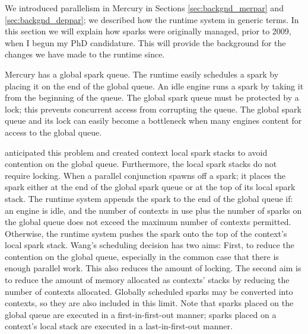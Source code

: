 We introduced parallelism in Mercury in Sections \ref{sec:backgnd_merpar} and
\ref{sec:backgnd_deppar};
we described how the runtime system in generic terms.
In this section we will explain how sparks were originally managed,
prior to 2009, when I begun my PhD candidature.
This will provide the background for the changes we have made to the
runtime since.

Mercury has a global spark queue.
The runtime easily schedules a spark by placing it on the end of the
global queue.
An idle engine runs a spark by taking it from the beginning of the queue.
The global spark queue must be protected by a lock;
this prevents concurrent access from corrupting the queue.
The global spark queue and its lock can easily become a bottleneck when many
engines content for access to the global queue.

\citet{wang-hons} anticipated this problem and created context local spark
stacks to avoid contention on the global queue.
Furthermore, the local spark stacks do not require locking.
When a parallel conjunction spawns off a spark; it places the spark either
at the end of the global spark queue or at the top of its local spark stack.
The runtime system appends the spark to the end of the global queue if:
an engine is idle, and
the number of contexts in use plus the number of sparks on the global queue
does not exceed the maximum number of contexts permitted.
Otherwise,
the runtime system pushes the spark onto the top of the context's local
spark stack.
Wang's scheduling decision has two aims:
First, to reduce the contention on the global queue,
especially in the common case that there is enough parallel work.
This also reduces the amount of locking.
The second aim is to reduce the amount of memory allocated
as contexts' stacks by reducing the number of contexts allocated.
Globally scheduled sparks may be converted into contexts,
so they are also included in this limit.
Note that sparks placed on the global queue are executed in a
first-in-first-out manner;
sparks placed on a context's local stack are executed in a
last-in-first-out manner.

